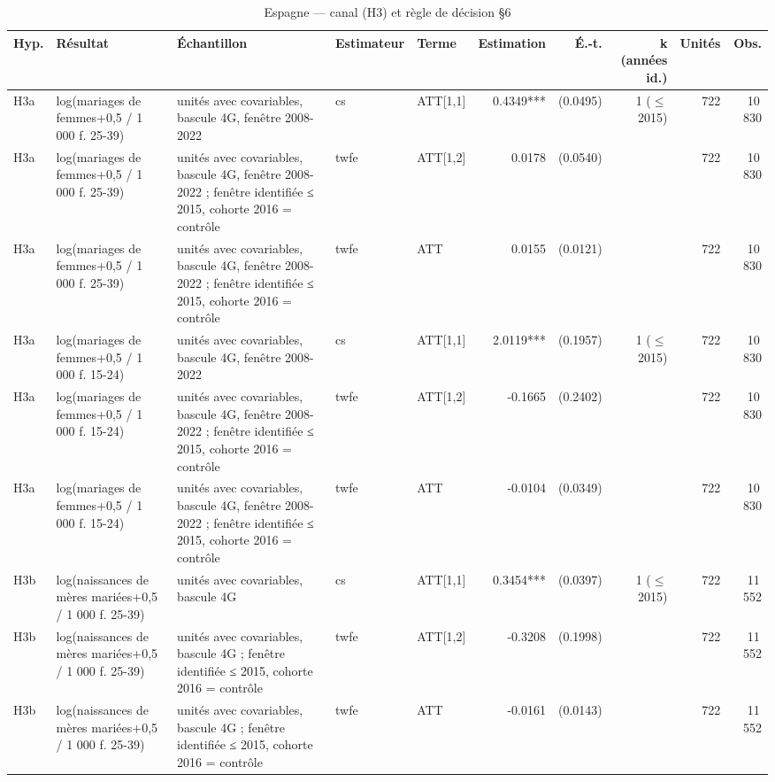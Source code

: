 \begin{table}\centering
\begin{threeparttable}
\caption{Espagne — canal (H3) et règle de décision §6}\label{tab:es_h3}
\scriptsize
\begin{tabular}{lp{4.4cm}p{6.3cm}lp{3.5cm}rrrrr}
\toprule
Hyp. & Résultat & Échantillon & Estimateur & Terme & Estimation & É.-t. & k (années id.) & Unités & Obs. \\
\midrule
H3a & log(mariages de femmes+0,5 / 1 000 f. 25-39) & unités avec covariables, bascule 4G, fenêtre 2008-2022 & cs & ATT[1,1] & 0.4349*** & (0.0495) & 1 ($\leq$ 2015) & 722 & 10\,830 \\
H3a & log(mariages de femmes+0,5 / 1 000 f. 25-39) & unités avec covariables, bascule 4G, fenêtre 2008-2022 ; fenêtre identifiée ≤ 2015, cohorte 2016 = contrôle & twfe & ATT[1,2] & 0.0178 & (0.0540) &  & 722 & 10\,830 \\
H3a & log(mariages de femmes+0,5 / 1 000 f. 25-39) & unités avec covariables, bascule 4G, fenêtre 2008-2022 ; fenêtre identifiée ≤ 2015, cohorte 2016 = contrôle & twfe & ATT & 0.0155 & (0.0121) &  & 722 & 10\,830 \\
H3a & log(mariages de femmes+0,5 / 1 000 f. 15-24) & unités avec covariables, bascule 4G, fenêtre 2008-2022 & cs & ATT[1,1] & 2.0119*** & (0.1957) & 1 ($\leq$ 2015) & 722 & 10\,830 \\
H3a & log(mariages de femmes+0,5 / 1 000 f. 15-24) & unités avec covariables, bascule 4G, fenêtre 2008-2022 ; fenêtre identifiée ≤ 2015, cohorte 2016 = contrôle & twfe & ATT[1,2] & -0.1665 & (0.2402) &  & 722 & 10\,830 \\
H3a & log(mariages de femmes+0,5 / 1 000 f. 15-24) & unités avec covariables, bascule 4G, fenêtre 2008-2022 ; fenêtre identifiée ≤ 2015, cohorte 2016 = contrôle & twfe & ATT & -0.0104 & (0.0349) &  & 722 & 10\,830 \\
H3b & log(naissances de mères mariées+0,5 / 1 000 f. 25-39) & unités avec covariables, bascule 4G & cs & ATT[1,1] & 0.3454*** & (0.0397) & 1 ($\leq$ 2015) & 722 & 11\,552 \\
H3b & log(naissances de mères mariées+0,5 / 1 000 f. 25-39) & unités avec covariables, bascule 4G ; fenêtre identifiée ≤ 2015, cohorte 2016 = contrôle & twfe & ATT[1,2] & -0.3208 & (0.1998) &  & 722 & 11\,552 \\
H3b & log(naissances de mères mariées+0,5 / 1 000 f. 25-39) & unités avec covariables, bascule 4G ; fenêtre identifiée ≤ 2015, cohorte 2016 = contrôle & twfe & ATT & -0.0161 & (0.0143) &  & 722 & 11\,552 \\

\end{tabular}
\end{threeparttable}
\end{table}
